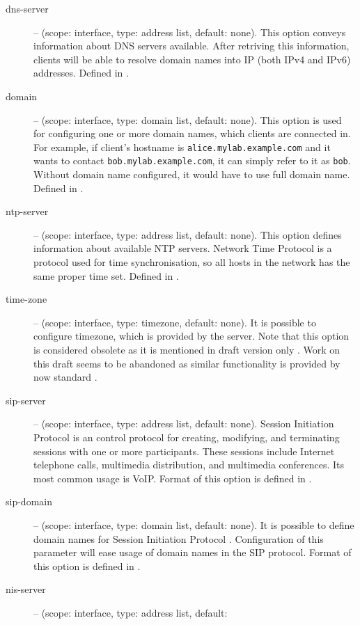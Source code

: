 \begin{description}
 \item[dns-server] -- (scope: interface, type: address list, default:
	    none). This option conveys information about DNS servers
	    available. After retriving this information, clients will be
	    able to resolve domain names into IP (both IPv4 and IPv6)
	    addresses. Defined in \cite{rfc3596}.
 \item[domain] -- (scope: interface, type: domain list, default:
	    none). This option is used for configuring one or more domain 
	    names, which clients are connected in. For example, if
	    client's hostname is \verb+alice.mylab.example.com+ and it wants to
	    contact \verb+bob.mylab.example.com+, it can simply refer to it as
	    \verb+bob+. Without domain name configured, it would have to
	    use full domain name. Defined in \cite{rfc3596}.
 \item[ntp-server] -- (scope: interface, type: address list, default:
	    none). This option defines information about available NTP
	    servers. Network Time Protocol \cite{rfc2030} is a protocol used
	    for time synchronisation, so all hosts in the network has
	    the same proper time set. Defined in \cite{rfc4075}.
 \item[time-zone] -- (scope: interface, type: timezone, default:
	    none). It is possible to configure timezone, which is
            provided by the server. Note that this option is
	    considered obsolete as it is mentioned in draft version only
	    \cite{draft-timezone}. Work on this draft seems to be
	    abandoned as similar functionality is provided by now
	    standard \cite{rfc4075}.
 \item[sip-server] -- (scope: interface, type: address list, default:
	    none). Session Initiation Protocol \cite{rfc3263} is an
	    control protocol for creating, modifying, and terminating
	    sessions with one or more participants. These sessions
	    include Internet telephone calls, multimedia distribution,
	    and multimedia conferences. Its most common usage is
	    VoIP. Format of this option is defined in \cite{rfc3319}.
 \item[sip-domain] -- (scope: interface, type: domain list, default:
	    none). It is possible to define domain names for Session
	    Initiation Protocol \cite{rfc3263}. Configuration of this
	    parameter will ease usage of domain names in the SIP
	    protocol. Format of this option is defined in
	    \cite{rfc3319}.
 \item[nis-server] -- (scope: interface, type: address list, default:

\end{description}
